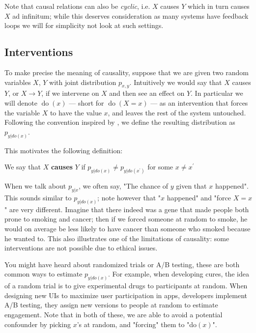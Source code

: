 Note that causal relations can also be \textit{cyclic}, i.e. $X$ causes $Y$ which in turn causes 
$X$ ad infinitum; while this deserves consideration as many systems have feedback loops we will
for simplicity not look at such settings.

\subsection{Interventions}

To make precise the meaning of causality, suppose that we are given 
two random variables $X$, $Y$ with joint distribution $p_{x, y}$. Intuitively we 
would say that $X$ causes $Y$, or $X \rightarrow Y$, if we intervene on $X$ and then see an effect on $Y$. In particular
we will denote $\operatorname{do}(x)$ --- short for $\operatorname{do}(X = x)$ --- as an intervention
that forces the variable $X$ to have the value $x$, and leaves the rest of the system untouched. 
Following the convention inspired by \cite{pearl2000causality}, 
we define the resulting distribution as $p_{y|do(x)}$.

This motivates the following definition:

\begin{definition}
    We say that $X$ \textbf{causes} $Y$ if $p_{y|do(x)} \neq p_{y|do(x^\prime)}$ for some
    $x \neq x^\prime$
\end{definition}

When we talk about $p_{y|x}$, we often say, "The chance of $y$ given that $x$ happened". This sounds similar
to $p_{y|do(x)}$; note however that "$x$ happened" and "force $X = x$" are very different. Imagine that 
there indeed was a gene that made people both prone to smoking and cancer; then if we forced someone at 
random to smoke, he would on average be less likely to have cancer than someone who smoked because he wanted to.
This also illustrates 
one of the limitations of causality: some interventions are not possible due to ethical issues.

You might have heard about randomized trials or A/B testing, these are both common ways to estimate $p_{y|do(x)}$.
For example, when developing cures, the idea of a random trial is to give experimental drugs to participants
at random. When designing new UIs to maximize user participation in apps, developers implement A/B testing, 
they assign new versions to people at random to estimate engagement. Note that in both of these, we are able 
to avoid a potential confounder by picking $x$'s at random, and "forcing" them to "do$(x)$".

